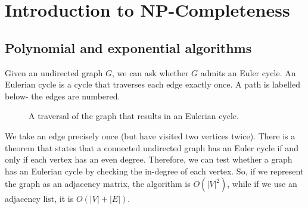 \documentclass[a4paper, openany]{memoir}
\begin{document}
\chapter{Introduction to NP-Completeness}
\section{Polynomial and exponential algorithms}

Given an undirected graph $G$, we can ask whether $G$ admits an Euler cycle. An Eulerian cycle is a cycle that traverses each edge exactly once. A path is labelled below- the edges are numbered.
\begin{figure}[H]
    \centering
    \caption{A traversal of the graph that results in an Eulerian cycle.}
\end{figure}
\noindent We take an edge precisely once (but have visited two vertices twice). There is a theorem that states that a connected undirected graph has an Euler cycle if and only if each vertex has an even degree. Therefore, we can test whether a graph has an Eulerian cycle by checking the in-degree of each vertex. So, if we represent the graph as an adjacency matrix, the algorithm is $O(|V|^2)$, while if we use an adjacency list, it is $O(|V| + |E|)$.
\end{document}
